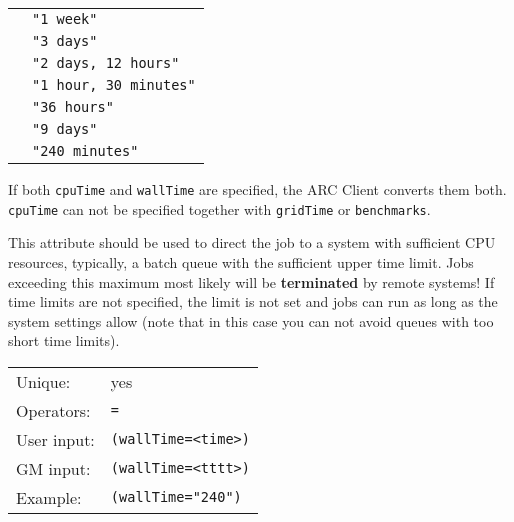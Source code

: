   \begin{tabular}{ll}
    \hspace*{1cm}&\texttt{"1 week"}\\
    \hspace*{1cm}&\texttt{"3 days"}\\
    \hspace*{1cm}&\texttt{"2 days, 12 hours"}\\
    \hspace*{1cm}&\texttt{"1 hour, 30 minutes"}\\
    \hspace*{1cm}&\texttt{"36 hours"}\\
    \hspace*{1cm}&\texttt{"9 days"}\\
    \hspace*{1cm}&\texttt{"240 minutes"}\\
  \end{tabular}
 
  If both \texttt{cpuTime} and \texttt{wallTime} are specified, the ARC Client converts them 
  both. \texttt{cpuTime} can not be specified together with \texttt{gridTime}
  or \texttt{benchmarks}.
 
  \begin{framed}
    This attribute should be used to direct the job to a system with
    sufficient CPU resources, typically, a batch queue with the
    sufficient upper time limit. Jobs exceeding this maximum most
    likely will be \textbf{terminated} by remote systems! If
    time limits are not specified, the limit is not set and jobs
    can run as long as the system settings allow (note that in this
    case you can not avoid queues with too short time limits).
  \end{framed}

  \hspace*{0.5cm}
  \begin{shaded}
  \end{shaded}
  \begin{tabular}{lp{13cm}}
    Unique:&yes\\
    Operators:&\verb#=#\\
    User input:&\verb#(wallTime=<time>)#\\
    GM input:&\verb#(wallTime=<tttt>)#\\
    Example:&\verb#(wallTime="240")#\\
  \end{tabular}

